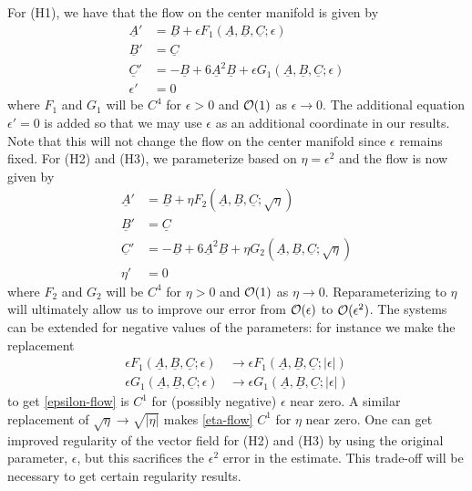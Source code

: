 For (H1), we have that the flow on the center manifold is given by
\begin{equation}\label{epsilon-flow}
	\begin{aligned}
		\underline A ' &= \underline B + \epsilon F_1(\underline A, \underline B, \underline C;\epsilon) \\
		\underline B ' &= \underline C \\
		\underline C ' &= - \underline B + 6 \underline A^2 \underline B + \epsilon G_1(\underline A, \underline B, \underline C;\epsilon) \\
		\epsilon' &= 0
	\end{aligned}
\end{equation}
where \(F_1\) and \(G_1\) will be \(C^4\) for \(\epsilon > 0\) and \(\mathcal{O}(1)\) as \(\epsilon \to 0\). The additional equation \(\epsilon' = 0\) is added so that we may use \(\epsilon\) as an additional coordinate in our results. Note that this will not change the flow on the center manifold since \(\epsilon\) remains fixed. For (H2) and (H3), we parameterize based on \(\eta = \epsilon^2\) and the flow is now given by
\begin{equation}\label{eta-flow}
	\begin{aligned}
		\underline A ' &= \underline B + \eta F_2(\underline A, \underline B, \underline C;\sqrt \eta) \\
		\underline B ' &= \underline C \\
		\underline C ' &= - \underline B + 6 \underline A^2 \underline B + \eta G_2(\underline A, \underline B, \underline C;\sqrt\eta) \\
		\eta' &= 0
	\end{aligned}
\end{equation}
where \(F_2\) and \(G_2\) will be \(C^4\) for \(\eta > 0\) and \(\mathcal{O}(1)\) as \(\eta \to 0\). Reparameterizing to \(\eta\) will ultimately allow us to improve our error from \(\mathcal{O}(\epsilon)\) to \(\mathcal{O}(\epsilon^2)\). The systems can be extended for negative values of the parameters: for instance we make the replacement
\begin{equation}
\begin{aligned}
	\epsilon F_1(\underline A, \underline B, \underline C; \epsilon) &\rightarrow \epsilon F_1(\underline A, \underline B, \underline C; |\epsilon|) \\
	\epsilon G_1(\underline A, \underline B, \underline C; \epsilon) &\rightarrow \epsilon G_1(\underline A, \underline B, \underline C; |\epsilon|)
\end{aligned}
\end{equation}
to get \cref{epsilon-flow} is \(C^1\) for (possibly negative) \(\epsilon\) near zero. A similar replacement of \(\sqrt \eta \rightarrow \sqrt{|\eta|}\) makes \cref{eta-flow} \(C^1\) for \(\eta\) near zero. One can get improved regularity of the vector field for (H2) and (H3) by using the original parameter, \(\epsilon\), but this sacrifices the \(\epsilon^2\) error in the estimate. This trade-off will be necessary to get certain regularity results.

